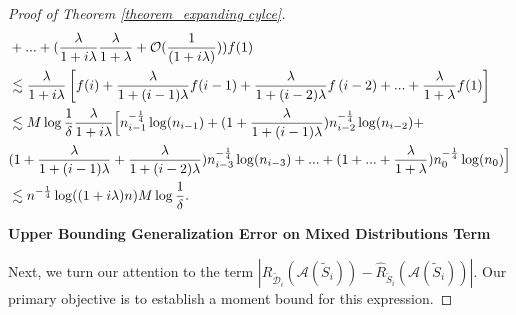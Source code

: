 \begin{proof}[Proof of Theorem \ref{theorem_expanding cylce}]
\begin{align}
 &+...+(\frac{\lambda}{1+i \lambda}\frac{\lambda}{1+\lambda}+\mathcal{O}(\frac{1}{(1+i\lambda)}))f(1) \notag \\
 &\lesssim \frac{\lambda}{1+i \lambda} \left[f(i)+\frac{\lambda}{1+(i-1) \lambda} f(i-1)+\frac{\lambda}{1+(i-2) \lambda}f\left(i-2\right)+...+\frac{\lambda}{1+\lambda}f(1)\right]\notag \\
 &\lesssim M\log \frac{1}{\delta}\frac{\lambda}{1+i \lambda} \Big[n_{i-1}^{-\frac{1}{4}}\log (n_{i-1})+(1+\frac{\lambda}{1+(i-1) \lambda})n_{i-2}^{-\frac{1}{4}}\log (n_{i-2})+\notag \\
 &(1+\frac{\lambda}{1+(i-1) \lambda}+\frac{\lambda}{1+(i-2) \lambda})n_{i-3}^{-\frac{1}{4}}\log (n_{i-3})+...+(1+...+\frac{\lambda}{1+\lambda})n_{0}^{-\frac{1}{4}}\log (n_{0})\Big] \notag \\
 &\lesssim n^{-\frac{1}{4}}\log ((1+i\lambda)n)M\log\frac{1}{\delta}\label{proof4_hhhh}.
\end{align}





\textbf{Upper Bounding Generalization Error on Mixed Distributions Term}


Next, we turn our attention to the term $|R_{\widetilde{\mathcal{D}}_i}(\mathcal{A}(\widetilde{S}_i))-\widehat{R}_{\widetilde{S}_i}(\mathcal{A}(\widetilde{S}_i))|$. Our primary objective is to establish a moment bound for this expression.


\end{proof}
